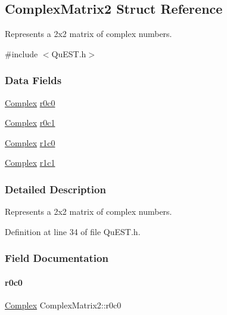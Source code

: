 \hypertarget{structComplexMatrix2}{}\subsection{Complex\+Matrix2 Struct Reference}
\label{structComplexMatrix2}


Represents a 2x2 matrix of complex numbers.  




{\ttfamily \#include $<$Qu\+E\+S\+T.\+h$>$}

\subsubsection*{Data Fields}
\begin{DoxyCompactItemize}
\item 
\mbox{\hyperlink{structComplex}{Complex}} \mbox{\hyperlink{structComplexMatrix2_ae72b4458233b077a636beee1892e81ff}{r0c0}}
\item 
\mbox{\hyperlink{structComplex}{Complex}} \mbox{\hyperlink{structComplexMatrix2_a0f3932f055a8b05cef361bce25d51172}{r0c1}}
\item 
\mbox{\hyperlink{structComplex}{Complex}} \mbox{\hyperlink{structComplexMatrix2_ab98282015ed2065e53fbc9638e2583ab}{r1c0}}
\item 
\mbox{\hyperlink{structComplex}{Complex}} \mbox{\hyperlink{structComplexMatrix2_a763007c3070802373549ba0350f83c8a}{r1c1}}
\end{DoxyCompactItemize}


\subsubsection{Detailed Description}
Represents a 2x2 matrix of complex numbers. 

Definition at line 34 of file Qu\+E\+S\+T.\+h.



\subsubsection{Field Documentation}
\mbox{\label{structComplexMatrix2_ae72b4458233b077a636beee1892e81ff}} 
\paragraph{\texorpdfstring{r0c0}{r0c0}}
{\footnotesize\ttfamily \mbox{\hyperlink{structComplex}{Complex}} Complex\+Matrix2\+::r0c0}



